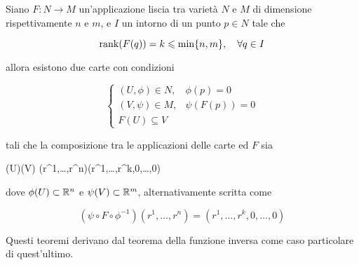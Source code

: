 \begin{theorem}\label{thrm:const-rank}
	Siano $ F : N \to M $ un'applicazione liscia tra varietà $ N $ e $ M $ di dimensione rispettivamente $ n $ e $ m $, e $ I $ un intorno di un punto $ p \in N $ tale che
	
	\begin{equation}
		\rank(F(q)) = k \leqslant \min\{n,m\} \qcomma \forall q \in I
	\end{equation}

	allora esistono due carte con condizioni
	
	\begin{equation}
		\begin{cases}
			(U,\phi) \in N, & \phi(p) = 0 \\
			(V,\psi) \in M, & \psi(F(p)) = 0 \\
			F(U) \subseteq V
		\end{cases}
	\end{equation}

	tali che la composizione tra le applicazioni delle carte ed $ F $ sia
	
		{\phi(U)}{\psi(V)}
		{(r^{1},\dots,r^{n})}{(r^{1},\dots,r^{k},0,\dots,0)}

	dove $ \phi(U) \subset \mathbb{R}^{n} $ e $ \psi(V) \subset \mathbb{R}^{m} $, alternativamente scritta come
	
	\begin{equation}
		(\psi \circ F \circ \phi^{-1})(r^{1},\dots,r^{n}) = (r^{1},\dots,r^{k},0,\dots,0)
	\end{equation}
\end{theorem}

Questi teoremi derivano dal teorema della funzione inversa come caso particolare di quest'ultimo.

